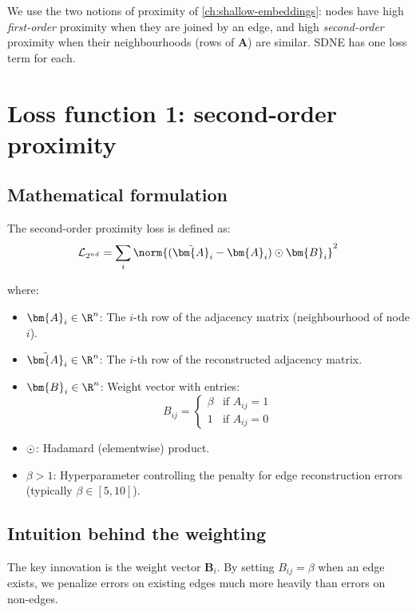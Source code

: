\begin{notechapter}
We use the two notions of proximity of \cref{ch:shallow-embeddings}: nodes have high \emph{first-order} proximity when they are joined by an edge, and high \emph{second-order} proximity when their neighbourhoods (rows of $\bm A$) are similar. SDNE has one loss term for each.

\section{Loss function 1: second-order proximity}

\subsection{Mathematical formulation}

The second-order proximity loss is defined as:
\begin{equation}
\mathcal{L}_{2^{nd}} = \sum_{i} \norm{(\tilde{\bm{A}}_i - \bm{A}_i) \hadamard \bm{B}_i}^2
\label{graph-autoencoders:eq:l2_loss}
\end{equation}

where:
\begin{itemize}
    \item $\bm{A}_i \in \R^n$: The $i$-th row of the adjacency matrix (neighbourhood of node $i$).
    \item $\tilde{\bm{A}}_i \in \R^n$: The $i$-th row of the reconstructed adjacency matrix.
    \item $\bm{B}_i \in \R^n$: Weight vector with entries:
    \begin{equation}
    B_{ij} = \begin{cases}
    \beta & \text{if } A_{ij} = 1 \\
    1 & \text{if } A_{ij} = 0
    \end{cases}
    \end{equation}
    \item $\odot$: Hadamard (elementwise) product.
    \item $\beta > 1$: Hyperparameter controlling the penalty for edge reconstruction errors (typically $\beta \in [5, 10]$).
\end{itemize}

\subsection{Intuition behind the weighting}

The key innovation is the weight vector $\bm{B}_i$. By setting $B_{ij} = \beta$ when an edge exists, we penalize errors on existing edges much more heavily than errors on non-edges.


\end{notechapter}

